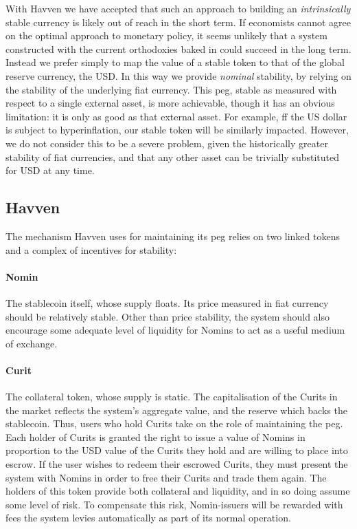 \noindent With Havven we have accepted that such an approach to building an \textit{intrinsically} stable
currency is likely out of reach in the short term.
If economists cannot agree on the optimal approach to monetary policy, it seems unlikely that a system
constructed with the current orthodoxies baked in could succeed in the long term.
Instead we prefer simply to map the value of a stable token to that of the global reserve currency, the USD.
In this way we provide \textit{nominal} stability, by relying on the stability of the underlying
fiat currency.
This peg, stable as measured with respect to a single external asset, is more achievable, though it has
an obvious limitation: it is only as good as that external asset.
For example, ff the US dollar is subject to hyperinflation, our stable token will be similarly impacted.
However, we do not consider this to be a severe problem, given the historically greater stability of
fiat currencies, and that any other asset can be trivially substituted for USD at any time. \\

\subsection{Havven}
\noindent The mechanism Havven uses for maintaining its peg relies on two linked tokens and a
complex of incentives for stability:

\paragraph{Nomin} The stablecoin itself, whose supply floats. Its price measured in fiat currency should be relatively stable.
Other than price stability, the system should also encourage some adequate level of liquidity for Nomins
to act as a useful medium of exchange.

\paragraph{Curit} The collateral token, whose supply is static.
The capitalisation of the Curits in the market reflects the system's aggregate value, and the reserve
which backs the stablecoin. Thus, users who hold Curits take on the role of maintaining the peg. \\

\noindent Each holder of Curits is granted the right to issue a value of Nomins in proportion to the USD value
of the Curits they hold and are willing to place into escrow. If the user wishes to redeem their escrowed Curits, they must
present the system with Nomins in order to free their Curits and trade them again.
The holders of this token provide both collateral and liquidity, and in so doing assume some
level of risk. To compensate this risk, Nomin-issuers will be rewarded with fees the system levies
automatically as part of its normal operation.


